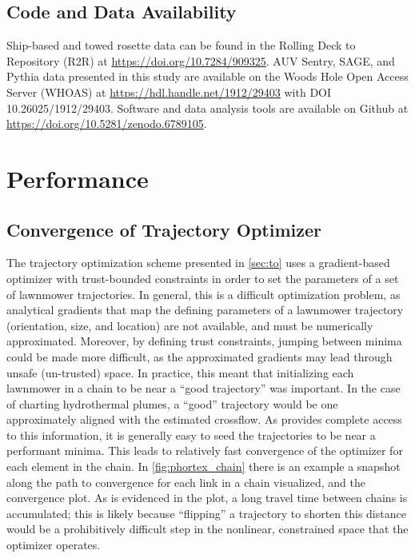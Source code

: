 \section{Code and Data Availability}
Ship-based and towed rosette data can be found in the Rolling Deck to Repository (R2R) at \url{https://doi.org/10.7284/909325}. AUV Sentry, SAGE, and Pythia data presented in this study are available on the Woods Hole Open Access Server (WHOAS) at \url{https://hdl.handle.net/1912/29403} with DOI 10.26025/1912/29403. Software and data analysis tools are available on Github at \url{https://doi.org/10.5281/zenodo.6789105}.

\chapter{\PHORTEX Performance}
\label{app:phortex}

\section{Convergence of Trajectory Optimizer}
The trajectory optimization scheme presented in \cref{sec:to} uses a gradient-based optimizer with trust-bounded constraints in order to set the parameters of a set of lawnmower trajectories. In general, this is a difficult optimization problem, as analytical gradients that map the defining parameters of a lawnmower trajectory (orientation, size, and location) are not available, and must be numerically approximated. Moreover, by defining trust constraints, jumping between minima could be made more difficult, as the approximated gradients may lead through unsafe (un-trusted) space. In practice, this meant that initializing each lawnmower in a chain to be near a ``good trajectory'' was important. In the case of charting hydrothermal plumes, a ``good'' trajectory would be one approximately aligned with the estimated crossflow. As \PHUMES provides complete access to this information, it is generally easy to seed the trajectories to be near a performant minima. This leads to relatively fast convergence of the optimizer for each element in the chain. In \cref{fig:phortex_chain} there is an example a snapshot along the path to convergence for each link in a chain visualized, and the convergence plot. As is evidenced in the plot, a long travel time between chains is accumulated; this is likely because ``flipping'' a trajectory to shorten this distance would be a prohibitively difficult step in the nonlinear, constrained space that the optimizer operates.

